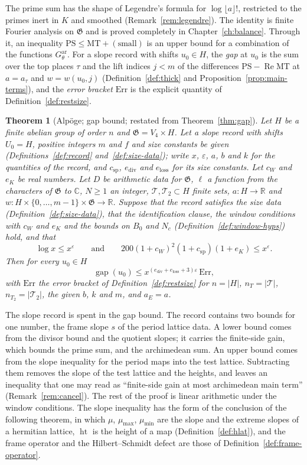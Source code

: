 \documentclass[11pt]{amsbook}
\theoremstyle{plain}
\newtheorem{theorem}{Theorem}[section]
\theoremstyle{definition}
\theoremstyle{remark}
\numberwithin{equation}{section}
\numberwithin{figure}{chapter}
\numberwithin{table}{chapter}
\newcommand{\R}{\mathbb{R}}
\renewcommand{\C}{\mathbb{C}}
\newcommand{\eps}{\varepsilon}
\newcommand{\GG}{\mathfrak{G}}
\newcommand{\GPsi}{G^{\mathrm{ar}}}
\newcommand{\PS}{\mathrm{PS}}
\newcommand{\MT}{\mathrm{MT}}
\newcommand{\Top}{\mathcal{T}}
\newcommand{\gap}{\operatorname{gap}}
\newcommand{\Err}{\mathrm{Err}}
\begin{document}
\noindent The prime sum has the shape of Legendre's formula for
$\log\lfloor a\rfloor!$, restricted to the primes inert in $K$ and
smoothed (Remark~\ref{rem:legendre}). The identity is finite Fourier
analysis on $\GG$ and is proved completely in
Chapter~\ref{ch:balance}. Through it, an inequality
$\PS\le\MT+(\text{small})$ is an upper bound for a combination of the
functions $\GPsi_\theta$. For a slope record with shifts $u_0\in H$,
the \emph{gap} at $u_0$ is the sum over the top places $\tau$ and
the lift indices $j<m$ of the differences $\PS-\operatorname{Re}\MT$
at $a=a_\tau$ and $w=w(u_0,j)$ (Definition~\ref{def:thick} and
Proposition~\ref{prop:main-terms}), and the \emph{error bracket}
$\Err$ is the explicit quantity of Definition~\ref{def:restsize}.

\begin{theorem}[Alp\"oge; gap bound; restated from
Theorem~\ref{thm:gap}]
\label{bb:gap}
Let $H$ be a finite abelian group of order $n$ and $\GG=V_4\times H$.
Let a slope record with shifts $U_0=H$, positive integers $m$ and $f$
and size constants be given (Definitions~\ref{def:record}
and~\ref{def:size-data}); write $x$, $\eps$, $a$, $b$ and $k$ for
the quantities of the record, and $c_{\mathrm{sp}}$,
$e_{\mathrm{div}}$ and $e_{\mathrm{loss}}$ for its size constants. Let
$c_W$ and $e_K$ be real numbers. Let $D$ be arithmetic data for $\GG$,
$\ell$ a function from the
characters of $\GG$ to $\C$, $N\ge1$ an integer, $\Top,\Top_2\subset
H$ finite sets, $a\colon H\to\R$ and
$w\colon H\times\{0,\dots,m-1\}\times\GG\to\R$.
Suppose that the record satisfies the size data
(Definition~\ref{def:size-data}), that the identification clause, the
window conditions with $c_W$ and $e_K$ and the bounds on $B_0$ and
$N_c$ (Definition~\ref{def:window-hyps}) hold, and that
\[
\log x\le x^\eps\qquad\text{and}\qquad
200(1+c_W)^2(1+c_{\mathrm{sp}})(1+e_K)\le x^\eps.
\]
Then for every $u_0\in H$
\[
\gap(u_0)\le x^{(e_{\mathrm{div}}+e_{\mathrm{loss}}+3)\eps}\,\Err,
\]
with $\Err$ the error bracket of Definition~\ref{def:restsize} for
$n=|H|$, $n_T=|\Top|$, $n_{T_2}=|\Top_2|$, the given $b$, $k$ and
$m$, and $a_E=a$.
\end{theorem}

\noindent The slope record is spent in the gap bound. The
record contains two bounds for one number, the frame slope $s$ of
the period lattice data. A lower bound comes from the divisor bound
and the quotient slopes; it carries the finite-side gain, which
bounds the prime sum, and the archimedean sum. An upper bound comes
from the slope inequality for the period maps into the test lattice.
Subtracting them removes the slope of the test lattice and the
heights, and leaves an inequality that one may read as ``finite-side
gain at most archimedean main term'' (Remark~\ref{rem:cancel}). The
rest of the proof is linear arithmetic under the window conditions.
The slope inequality has the form of the conclusion of the following
theorem, in which $\mu$,
$\mu_{\max}$, $\mu_{\min}$ are the slope and the extreme slopes of a
hermitian lattice, $\operatorname{ht}$ is the height of a map
(Definition~\ref{def:hlat}), and the frame operator and the
Hilbert--Schmidt defect are those of
Definition~\ref{def:frame-operator}.
\end{document}
